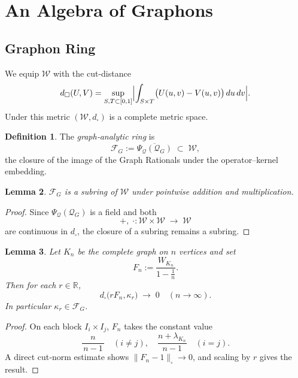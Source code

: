 \documentclass[11pt]{article}
\theoremstyle{definition}
\newtheorem{definition}{Definition}[section]
\theoremstyle{plain}
\newtheorem{lemma}[definition]{Lemma}
\theoremstyle{remark}
\begin{document}
\section{An Algebra of Graphons}
\subsection{Graphon Ring}
\label{sec:graphon-algebra}
We equip $\mathcal{W}$ with the cut‐distance
\[
  d_\square(U,V)
  = \sup_{S,T\subset[0,1]}
    \Bigl|\int_{S\times T}\bigl(U(u,v)-V(u,v)\bigr)\,du\,dv\Bigr|.
\]
Under this metric $(\mathcal{W},d_\square)$ is a complete metric space.

\begin{definition}
The \emph{graph‐analytic ring} is
\[
  \mathcal{F}_G := \overline{\Psi_{\mathcal{Q}}(\mathcal{Q}_G)}
  \;\subset\;\mathcal{W},
\]
the closure of the image of the Graph Rationals under the operator–kernel embedding.
\end{definition}

\begin{lemma}
$\mathcal{F}_G$ is a subring of $\mathcal{W}$ under pointwise addition and multiplication.
\end{lemma}
\begin{proof}
Since $\Psi_{\mathcal Q}(\mathcal Q_G)$ is a field and both
\[
  +,\;\cdot : \mathcal{W}\times\mathcal{W}\;\to\;\mathcal{W}
\]
are continuous in $d_\square$, the closure of a subring remains a subring.
\end{proof}

\begin{lemma}\label{lem:const-approx}
Let $K_n$ be the complete graph on $n$ vertices and set
\[
  F_n := \frac{W_{K_n}}{1-\tfrac1n}.
\]
Then for each $r\in\mathbb{R}$,
\[
  d_\square\bigl(rF_n,\kappa_r\bigr)\;\longrightarrow\;0
  \quad(n\to\infty).
\]
In particular $\kappa_r\in\mathcal{F}_G$.
\end{lemma}
\begin{proof}
On each block $I_i\times I_j$, $F_n$ takes the constant value
\[
  \frac{n}{\,n-1\,}\quad(i\neq j),
  \quad
  \frac{n+\lambda_{K_n}}{\,n-1\,}\quad(i=j).
\]
A direct cut‐norm estimate shows $\|F_n-1\|_\square\to0$, and scaling by $r$ gives the result.
\end{proof}
\end{document}
